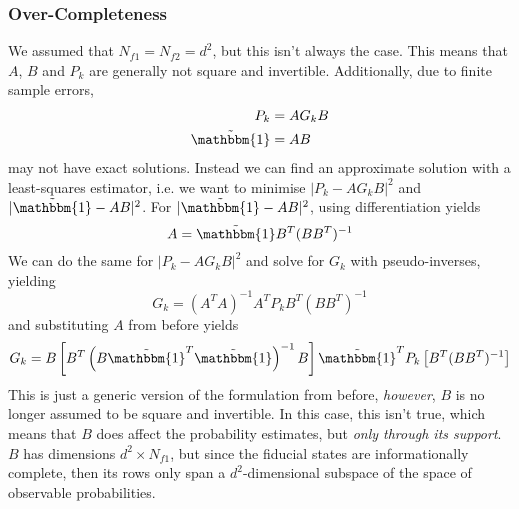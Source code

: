 \subsubsection{Over-Completeness}

We assumed that $N_{f1} = N_{f2} = d^2$, but this isn't always the case. This means that $A$, $B$
and $P_k$ are generally not square and invertible. Additionally, due to finite sample errors,
\begin{equation}
    \begin{aligned}
        P_k                 &= A G_k B \\
        \tilde{\mathbbm{1}} &= AB
    \end{aligned}
\end{equation}
may not have exact solutions. Instead we can find an approximate solution with a least-squares
estimator, i.e. we want to minimise $|P_k - A G_k B|^2$ and $|\tilde{\mathbbm{1}} - AB|^2$. For
$|\tilde{\mathbbm{1}} - AB|^2$, using differentiation yields
\begin{equation} \label{eq:min_i_tilde}
    A = \tilde{\mathbbm{1}} B^T (B B^T)^{-1}
\end{equation}
We can do the same for $|P_k - A G_k B|^2$ and solve for $G_k$ with pseudo-inverses, yielding
\begin{equation}
    G_k = (A^T A)^{-1} A^T P_k B^T (B B^T)^{-1}
\end{equation}
and substituting $A$ from before yields
\begin{equation}
    G_k = B \left[ B^T \left(B \tilde{\mathbbm{1}}^T \tilde{\mathbbm{1}}\right)^{-1} B\right]
    \tilde{\mathbbm{1}}^T P_k \left[B^T (B B^T)^{-1}\right]
\end{equation}
This is just a generic version of the formulation from before, \textit{however}, $B$ is no longer
assumed to be square and invertible. In this case, this isn't true, which means that $B$ does affect
the probability estimates, but \textit{only through its support}. $B$ has dimensions $d^2 \times
N_{f1}$, but since the fiducial states are informationally complete, then its rows only span a
$d^2$-dimensional subspace of the space of observable probabilities. 

